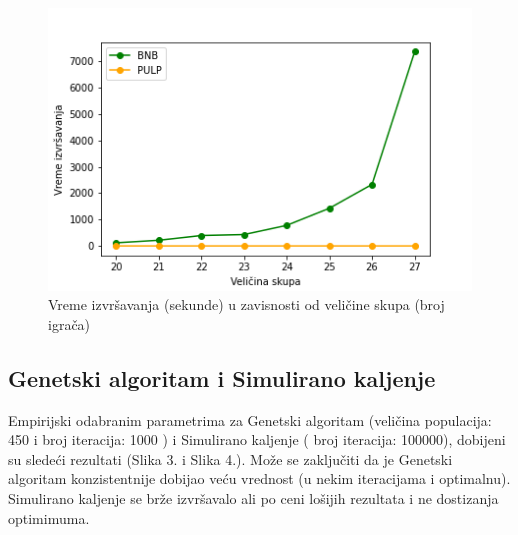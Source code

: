 \documentclass[a4paper]{article}
\begin{document}
\begin{figure}[H]
    \centering
    \includegraphics[scale=0.5]{img/exectimes.png}
    \caption{Vreme izvršavanja (sekunde) u zavisnosti od veličine skupa (broj igrača)}
    \label{fig:fig1}
\end{figure}

\subsection{Genetski algoritam i Simulirano kaljenje}

Empirijski odabranim parametrima za Genetski algoritam (veličina populacija: 450 i broj iteracija: 1000 ) i Simulirano kaljenje ( broj iteracija: 100000), dobijeni su sledeći rezultati (Slika 3. i Slika 4.). Može se zaključiti da je Genetski algoritam konzistentnije dobijao veću vrednost (u nekim iteracijama i optimalnu). Simulirano kaljenje se brže izvršavalo ali po ceni lošijih rezultata i ne dostizanja optimimuma.
\end{document}
